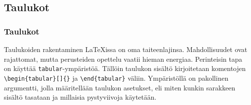 \subsection{Taulukot}
\begin{frame}[fragile]
    \frametitle{Taulukot}
    Taulukoiden rakentaminen \LaTeX issa on oma taiteenlajinsa. Mahdollisuudet ovat rajattomat, mutta perusteiden opettelu vaatii hieman energiaa. 
    \vaihto
Perinteisin tapa on käyttää \verb-tabular--ympäristöä. Tällöin taulukon sisältö kirjoitetaan komentojen \verb-\begin{tabular}[]{}- ja \verb-\end{tabular}- väliin.
    \vaihto
    Ympäristöllä on pakollinen argumentti, jolla määritellään taulukon asetukset, eli miten kunkin sarakkeen sisältö tasataan ja millaisia pystyviivoja käytetään.
\end{frame}

